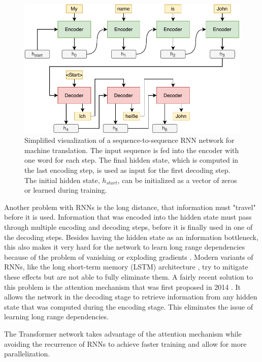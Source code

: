 \begin{figure}[h]
\centering
\includegraphics{figures/rnn-visualization}
\caption[Simplified visualization of a sequence-to-sequence RNN network for machine translation]{Simplified visualization of a sequence-to-sequence RNN network for machine translation. The input sequence is fed into the encoder with one word for each step. The final hidden state, which is computed in the last encoding step, is used as input for the first decoding step. The initial hidden state, $h_{start}$, can be initialized as a vector of zeros or learned during training.}
\label{fig:rnn-visualization}
\end{figure}

Another problem with RNNs is the long distance, that information must "travel" before it is used. %
Information that was encoded into the hidden state must pass through multiple encoding and decoding steps, before it is finally used in one of the decoding steps.
Besides having the hidden state as an information bottleneck, this also makes it very hard for the network to learn long range dependencies because of the problem of vanishing or exploding gradients \cite{Hochreiter01gradientflow}. %
Modern variants of RNNs, like the long short-term memory (LSTM) architecture \cite{Hochreiter1997}, try to mitigate these effects but are not able to fully eliminate them.
A fairly recent solution to this problem is the attention mechanism that was first proposed in 2014 \cite{1409.0473}.
It allows the network in the decoding stage to retrieve information from any hidden state that was computed during the encoding stage.
This eliminates the issue of learning long range dependencies.

The Transformer network takes advantage of the attention mechanism while avoiding the recurrence of RNNs to achieve faster training and allow for more parallelization.

